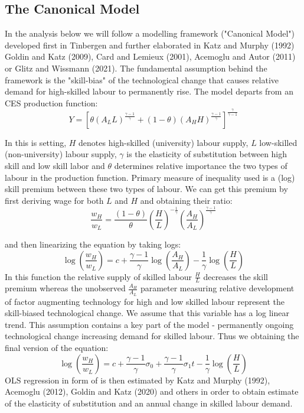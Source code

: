 \documentclass{article}
\begin{document}
\subsection{The Canonical Model}
In the analysis below we will follow a modelling framework ("Canonical Model") developed first in Tinbergen and further elaborated in Katz and Murphy (1992) Goldin and Katz (2009), Card and Lemieux (2001), Acemoglu and Autor (2011) or Glitz and Wissmann (2021).
The fundamental assumption behind the framework is the "skill-bias" of the technological change that causes relative demand for high-skilled labour to permanently rise.
The model departs from an CES production function:
\begin{equation}
\label{eqn:STBC_prod_function}
Y = [\theta(A_{L}L)^{\frac{\gamma - 1}{\gamma}} + (1 - \theta)(A_{H}H)^{\frac{\gamma - 1}{\gamma}}]^\frac{\gamma}{\gamma - 1}
\end{equation}

In this is setting, $H$ denotes high-skilled (university) labour supply, $L$ low-skilled (non-university) labour supply, $\gamma$ is the elasticity of substitution between high skill and low skill labor and $\theta$ determines relative importance the two types of labour in the production function. Primary measure of inequality used is a (log) skill premium between these two types of labour. We can get this premium by first deriving wage for both $L$ and $H$ and obtaining their ratio:
\[\frac{w_{H}}{w_{L}} = \frac{(1 - \theta)}{\theta} \left(\frac{H}{L}\right)^{-\frac{1}{\gamma}}\left(\frac{A_{H}}{A_{L}}\right)^{\frac{\gamma - 1}{\gamma}}\]

and then linearizing the equation by taking logs:
\[\log(\frac{w_{H}}{w_{L}}) = c + \frac{\gamma - 1}{\gamma}\log(\frac{A_{H}}{A_{L}}) - \frac{1}{\gamma}\log(\frac{H}{L})\]
In this function the relative supply of skilled labour $\frac{H}{L}$ decreases the skill premium whereas the unobserved $\frac{A_{H}}{A_{L}}$ parameter measuring relative development of factor augmenting technology for high and low skilled labour represent the skill-biased technological change. We assume that this variable has a log linear trend. This assumption contains a key part of the model - permanently ongoing technological change increasing demand for skilled labour. Thus we obtaining the final version of the equation:
\begin{equation}
\label{eqn:STBC_regression}
\log(\frac{w_{H}}{w_{L}}) = c + \frac{\gamma - 1}{\gamma}\sigma_0 + \frac{\gamma - 1}{\gamma}\sigma_{1}t - \frac{1}{\gamma}\log(\frac{H}{L})
\end{equation}
OLS regression in form of is then estimated by Katz and Murphy (1992), Acemoglu (2012), Goldin and Katz (2020) and others in order to obtain estimate of the elasticity of substitution and an annual change in skilled labour demand.
\end{document}
